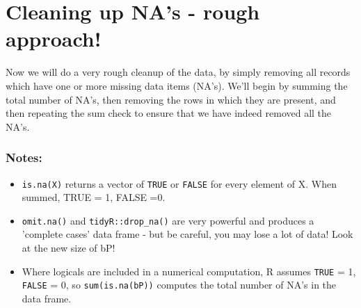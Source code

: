 \documentclass[titlepage]{book}\usepackage{knitr}
\begin{document}
\section{Cleaning up NA's - rough approach!}

Now we will do a very rough cleanup of the data, by simply removing all records which have one or more missing data items (NA's). We'll begin by summing the total number of NA's, then removing the rows in which they are present, and then repeating the sum check to ensure that we have indeed removed all the NA's.

\begin{knitrout}
\color{fgcolor}
\end{knitrout}

  \subsubsection{Notes:}

\begin{itemize} 

\item{\texttt{is.na(X)} returns a vector of \texttt{TRUE} or \texttt{FALSE} for every element of X. When summed, TRUE = 1, FALSE =0.}

\item{\texttt{omit.na()} and \texttt{tidyR::drop\_na()} are very powerful and produces a 'complete cases' data frame - but be careful, you may lose a lot of data!  Look at the new size of bP!}

\item{Where logicals are included in a numerical computation, R assumes \texttt{TRUE} = 1, \texttt{FALSE} = 0, so \texttt{sum(is.na(bP))} computes the total number of NA's in the data frame.}
\end{itemize}
\end{document}
